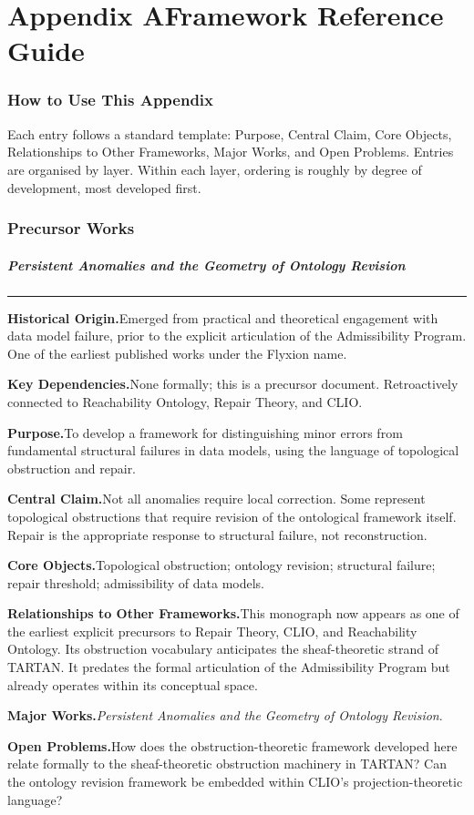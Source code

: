 \documentclass[12pt, twoside]{article}
\newcommand{\frameworkhead}[5]{  \subsubsection{#1}
  \noindent\textcolor{#2}{\rule{\linewidth}{0.8pt}}
  \smallskip

  \noindent\textbf{Historical Origin.}\quad #3

  \noindent\textbf{Key Dependencies.}\quad #4

  \noindent\textbf{Purpose.}\quad #5
}
\newcommand{\frameworkbody}[5]{  \noindent\textbf{Central Claim.}\quad #1

  \noindent\textbf{Core Objects.}\quad #2

  \noindent\textbf{Relationships to Other Frameworks.}\quad #3

  \noindent\textbf{Major Works.}\quad #4

  \noindent\textbf{Open Problems.}\quad #5
  \medskip
}
\begin{document}
\appendix
\part*{Appendix A\quad Framework Reference Guide}

\section{How to Use This Appendix}

Each entry follows a standard template: Purpose, Central Claim, Core
Objects, Relationships to Other Frameworks, Major Works, and Open Problems.
Entries are organised by layer. Within each layer, ordering is roughly by
degree of development, most developed first.

\section{Precursor Works}

\frameworkhead{Persistent Anomalies and the Geometry of Ontology Revision}{formalismgray}{Emerged from practical and theoretical engagement with data model failure,
prior to the explicit articulation of the Admissibility Program. One of the
earliest published works under the Flyxion name.}{None formally; this is a precursor document. Retroactively connected to
Reachability Ontology, Repair Theory, and CLIO.}{To develop a framework for distinguishing minor errors from fundamental
structural failures in data models, using the language of topological
obstruction and repair.}
\frameworkbody{Not all anomalies require local correction. Some represent topological
obstructions that require revision of the ontological framework itself.
Repair is the appropriate response to structural failure, not
reconstruction.}{Topological obstruction; ontology revision; structural failure; repair
threshold; admissibility of data models.}{This monograph now appears as one of the earliest explicit precursors to
Repair Theory, CLIO, and Reachability Ontology. Its obstruction vocabulary
anticipates the sheaf-theoretic strand of TARTAN. It predates the formal
articulation of the Admissibility Program but already operates within its
conceptual space.}{\emph{Persistent Anomalies and the Geometry of Ontology Revision}.}{How does the obstruction-theoretic framework developed here relate formally
to the sheaf-theoretic obstruction machinery in TARTAN? Can the ontology
revision framework be embedded within CLIO's projection-theoretic language?}
\end{document}
